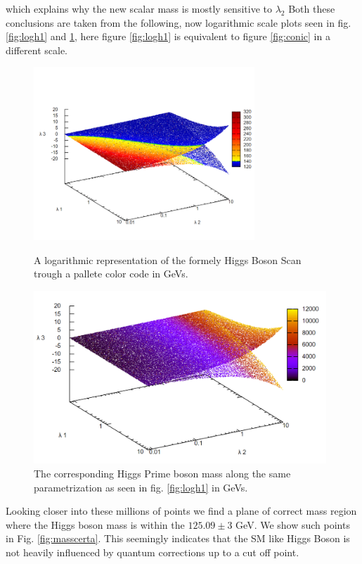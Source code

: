 \documentclass[12pt]{article}
\begin{document}
%
%
which explains why the new scalar mass is mostly sensitive to $\lambda_2$
%
Both these conclusions are taken from the following, now logarithmic scale plots seen in fig. \ref{fig:logh1} and \ref{fig:logh2}, here figure \ref{fig:logh1} is equivalent to figure \ref{fig:conic} in a different scale. 
%
\begin{figure}[H]
  \centering
  \includegraphics[width=\linewidth,height=6.5cm,keepaspectratio]{Logh11cone.png}
  \caption{A logarithmic representation of the formely Higgs Boson Scan trough a pallete color code in GeVs.}\label{fig:logh1}
  \endminipage\hfill
  \includegraphics[width=\linewidth,height=6.5cm,keepaspectratio]{Logh2cone.png}
  \caption{The corresponding Higgs Prime boson mass along the same parametrization as seen in fig. \ref{fig:logh1} in GeVs.}\label{fig:logh2}
\endminipage\hfill
\end{figure}
%
Looking closer into these millions of points we find a plane of correct mass region where the Higgs boson mass is within the $125.09 \pm 3$ GeV. We show such points in Fig. \ref{fig:masscerta}. This seemingly indicates that the SM like Higgs Boson is not heavily influenced by quantum corrections up to a cut off point.
\end{document}
